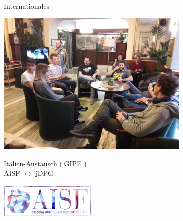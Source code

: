 \documentclass[
]{beamer}
\begin{document}
\begin{frame}{Internationales}
  \begin{minipage}{0.6\textwidth}
    \begin{flushleft}
      \includegraphics[width=0.7\textwidth]{figure/gipe_2018}
    \end{flushleft}
  \end{minipage}
  \begin{minipage}{0.38\textwidth}
    \begin{center}
      Italien-Austausch ( GIPE ) \\ AISF $\leftrightarrow$ jDPG
    \end{center}
    \begin{flushright}
      \includegraphics[width=0.35\textwidth]{figure/aisflogo}
    \end{flushright}
  \end{minipage}
  
  \vfill


\end{frame}
\end{document}
